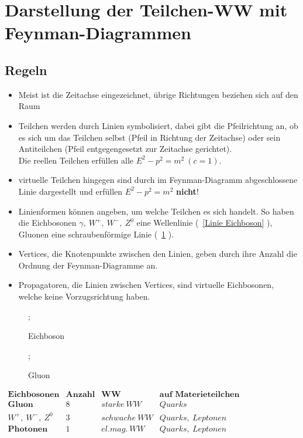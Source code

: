 \documentclass[Ex4_Zusammenfassung.tex]{subfiles}
\begin{document}
\section{Darstellung der Teilchen-WW mit Feynman-Diagrammen}
	\subsection*{Regeln}
	
	\begin{itemize}
		\item Meist ist die Zeitachse eingezeichnet, übrige Richtungen beziehen sich auf den Raum
		\item Teilchen werden durch Linien symbolisiert, dabei gibt die Pfeilrichtung an, ob es sich um das Teilchen selbst (Pfeil in Richtung der Zeitachse) oder sein Antiteilchen (Pfeil entgegengesetzt zur Zeitachse gerichtet).\\
		Die reellen Teilchen erfüllen alle $E^2 - p^2 = m^2\ (c=1)$.
		\item virtuelle Teilchen hingegen sind durch im Feynman-Diagramm abgeschlossene Linie dargestellt und erfüllen $E^2 - p^2 = m^2$ \textbf{nicht}!
		\item Linienformen können angeben, um welche Teilchen es sich handelt. So haben die Eichbosonen $\gamma,\ W^+,\ W^-,\ Z^0$ eine Wellenlinie (~\ref{Linie Eichboson} ), Gluonen eine schraubenförmige Linie (~\ref{Linie Gluon} ).
		\item Vertices, die Knotenpunkte zwischen den Linien, geben durch ihre Anzahl die Ordnung der Feynman-Diagramme an.
		\item Propagatoren, die Linien zwischen Vertices, sind virtuelle Eichbosonen, welche keine Vorzugsrichtung haben.
	\end{itemize}
	
	\begin{figure}[h]
		\centering
		;
		\caption{Eichboson}
		\label{Linie Eichboson}
		;
		\caption{Gluon}
		\label{Linie Gluon}
	\end{figure}
	
	$
	\begin{array}{c|ccc}
		\textbf{Eichbosonen} & \textbf{Anzahl} & \textbf{WW} & \textbf{auf Materieteilchen} \\
		\hline
		\textbf{Gluon} & 8 & starke\ WW & Quarks \\ 
		W^+,\ W^-,\ Z^0 & 3 & schwache\ WW & Quarks,\ Leptonen \\ 
		\textbf{Photonen} & 1 & el.mag.\ WW & Quarks,\ Leptonen
	\end{array} 
	$
	
\end{document}
